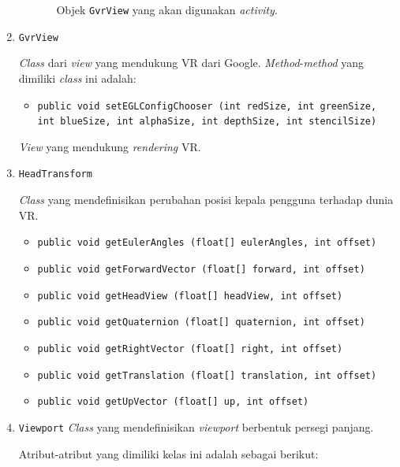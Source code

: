 \begin{enumerate}
\begin{itemize}
\begin{itemize}
					Objek \texttt{GvrView} yang akan digunakan \textit{activity}.
				\end{itemize}				
			\end{itemize}	 
		
		\item \texttt{GvrView}
		
		\textit{Class} dari \textit{view} yang mendukung VR dari Google. \textit{Method}-\textit{method} yang dimiliki \textit{class} ini adalah:
		
		\begin{itemize}
			\item \texttt{public void setEGLConfigChooser (int redSize, int greenSize, int blueSize, int alphaSize, int depthSize, int stencilSize)}
			
			
		\end{itemize}
		
		\textit{View} yang mendukung \textit{rendering} VR.		
		\item \texttt{HeadTransform}
		
		\textit{Class} yang mendefinisikan perubahan posisi kepala pengguna terhadap dunia VR.
		
		\begin{itemize}
			\item \texttt{public void getEulerAngles (float[] eulerAngles, int offset)}
			
			\item \texttt{public void getForwardVector (float[] forward, int offset)}

			\item \texttt{public void getHeadView (float[] headView, int offset)}
			
			\item \texttt{public void getQuaternion (float[] quaternion, int offset)}
			\item \texttt{public void getRightVector (float[] right, int offset)}
			
			\item \texttt{public void getTranslation (float[] translation, int offset)}
			
			\item \texttt{public void getUpVector (float[] up, int offset)}
		\end{itemize}			
		
		\item \texttt{Viewport}
		\textit{Class} yang mendefinisikan \textit{viewport} berbentuk persegi panjang. 
		
		Atribut-atribut yang dimiliki kelas ini adalah sebagai berikut:
		

\end{enumerate}
